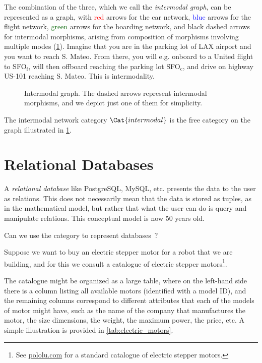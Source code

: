 \begin{example}
  The combination of the three, which we call the \emph{intermodal graph}, can be represented as a graph, with \textcolor{red}{red} arrows for the car network, \textcolor{blue}{blue} arrows for the flight network, \textcolor{darkgreen}{green} arrows for the boarding network, and black dashed arrows for intermodal morphisms, arising from composition of morphisms involving multiple modes (\cref{fig:intermodal}). Imagine that you are in the parking lot of \textsf{LAX} airport and you want to reach \textsf{S. Mateo}. From there, you will e.g. onboard to a \textsf{United} flight to \textsf{SFO}$_\mathrm{f}$, will then offboard reaching the parking lot \textsf{SFO}$_\mathrm{c}$, and drive on highway \textsf{US-101} reaching \textsf{S. Mateo}. This is intermodality.

  \begin{figure}[h!]
    \begin{center}
      {}
    \end{center}
    \caption{Intermodal graph. The dashed arrows represent intermodal morphisms, and we depict just one of them for simplicity. \label{fig:intermodal}
    }
  \end{figure}
\end{example}

The intermodal network category $\Cat{intermodal}$ is the free category on the graph illustrated in \cref{fig:intermodal}.

\section{Relational Databases}
\label{sec:relational-databases}

A \emph{relational database} like PostgreSQL, MySQL, etc. presents
the data to the user as relations. This does not necessarily mean
that the data is stored as tuples, as in the mathematical model, but
rather that what the user can do is query and manipulate relations.
This conceptual model is now 50 years old.

Can we use the category \Rel to represent databases~\cite{codd2002relational}?

Suppose we want to buy an electric stepper motor for a robot that we are building, and for this we consult a catalogue of electric stepper motors\footnote{See \href{https://www.pololu.com/category/87/stepper-motors}{pololu.com} for a standard catalogue of electric stepper motors.}.

The catalogue might be organized as a large table, where on the left-hand side there is a column listing all available motors (identified with a model ID), and the remaining columns correspond to different attributes that each of the models of motor might have, such as the name of the company that manufactures the motor, the size dimensions, the weight, the maximum power, the price, etc. A simple illustration is provided in \cref{tab:electric_motors}.

